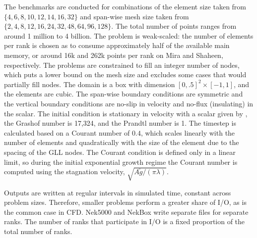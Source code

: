 The benchmarks are conducted for combinations of the element size taken from $\{4, 6, 8, 10, 12, 14, 16, 32\}$ and span-wise mesh size taken from $\{2, 4, 8, 12, 16, 24, 32, 48, 64, 96, 128\}$.
The total number of points ranges from around 1 million to 4 billion.
The problem is weak-scaled: the number of elements per rank is chosen as to consume approximately half of the available main memory, or around 16k and 262k points per rank on Mira and Shaheen, respectively.
The problems are constrained to fill an integer number of nodes, which puts a lower bound on the mesh size and excludes some cases that would partially fill nodes.
The domain is a box with dimension $[0,.5]^2 \times [-1,1]$, and the elements are cubic.
The span-wise boundary conditions are symmetric and the vertical boundary conditions are no-slip in velocity and no-flux (insulating) in the scalar.
The initial condition is stationary in velocity with a scalar given by , the Grashof number is 17,324, and the Prandtl number is 1.
The timestep is calculated based on a Courant number of $0.4$, which scales linearly with the number of elements and quadratically with the size of the element due to the spacing of the GLL nodes.
The Courant condition is defined only in a linear limit, so during the initial exponential growth regime the Courant number is computed using the stagnation velocity, $\sqrt{A \tilde{g}/(\pi \lambda)}$.


Outputs are written at regular intervals in simulated time, constant across problem sizes.
Therefore, smaller problems perform a greater share of I/O, as is the common case in CFD.
Nek5000 and NekBox write separate files for separate ranks.
The number of ranks that participate in I/O is a fixed proportion of the total number of ranks.

